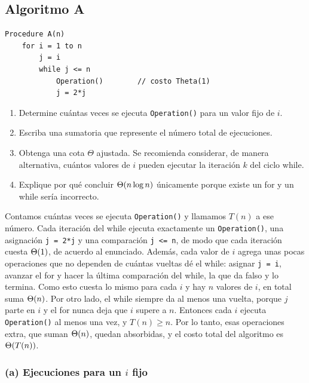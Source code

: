 \subsection{Algoritmo A}
\label{sec:act1a}

\begin{enunciado}
\begin{lstlisting}[language={}, numbers=none, frame=none, backgroundcolor={}]
Procedure A(n)
    for i = 1 to n
        j = i
        while j <= n
            Operation()        // costo Theta(1)
            j = 2*j
\end{lstlisting}
\begin{enumerate}[label=(\alph*)]
  \item Determine cuántas veces se ejecuta \texttt{Operation()} para un valor fijo de $i$.
  \item Escriba una sumatoria que represente el número total de ejecuciones.
  \item Obtenga una cota $\Theta$ ajustada. Se recomienda considerar, de manera
        alternativa, cuántos valores de $i$ pueden ejecutar la iteración $k$ del ciclo while.
  \item Explique por qué concluir $\Theta\!\left(n\log n\right)$ únicamente porque existe un for y un
        while sería incorrecto.
\end{enumerate}
\end{enunciado}

Contamos cuántas veces se ejecuta \texttt{Operation()} y llamamos $T(n)$ a ese número.
Cada iteración del while ejecuta exactamente un \texttt{Operation()}, una asignación
\texttt{j = 2*j} y una comparación \texttt{j <= n}, de modo que cada iteración cuesta
$\Theta\!\left(1\right)$, de acuerdo al enunciado. Además, cada valor de $i$ agrega unas pocas
operaciones que no dependen de cuántas vueltas dé el while: asignar \texttt{j = i}, avanzar el for y hacer la última
comparación del while, la que da falso y lo termina. Como esto cuesta lo mismo para cada
$i$ y hay $n$ valores de $i$, en total suma $\Theta\!\left(n\right)$. Por otro lado, el while siempre da
al menos una vuelta, porque $j$ parte en $i$ y el for nunca deja que $i$ supere a $n$.
Entonces cada $i$ ejecuta \texttt{Operation()} al menos una vez, y $T(n) \ge n$. Por lo
tanto, esas operaciones extra, que suman $\Theta\!\left(n\right)$, quedan absorbidas, y el costo total
del algoritmo es $\Theta\!\left(T(n)\right)$.

\subsubsection*{(a) Ejecuciones para un $i$ fijo}

